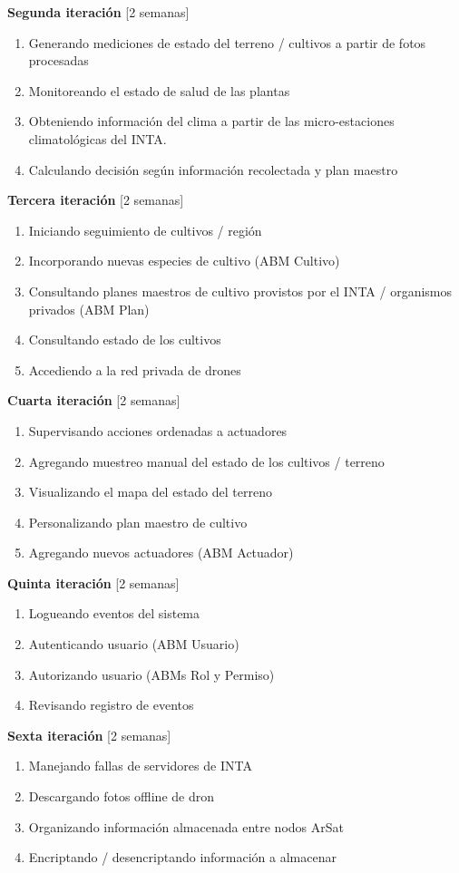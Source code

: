 \textbf{Segunda iteración} [2 semanas]
	\begin{enumerate}
		\item Generando mediciones de estado del terreno / cultivos a partir de fotos procesadas
		\item Monitoreando el estado de salud de las plantas
		\item Obteniendo información del clima a partir de las micro-estaciones climatológicas del INTA.
		\item Calculando decisión según información recolectada y plan maestro
	\end{enumerate}

\textbf{Tercera iteración} [2 semanas]
	\begin{enumerate}
		\item Iniciando seguimiento de cultivos / región
		\item Incorporando nuevas especies de cultivo (ABM Cultivo)
		\item Consultando planes maestros de cultivo provistos por el INTA / organismos privados (ABM Plan)
		\item Consultando estado de los cultivos
		\item Accediendo a la red privada de drones
	\end{enumerate}

\textbf{Cuarta iteración} [2 semanas]
	\begin{enumerate}
		\item Supervisando acciones ordenadas a actuadores
		\item Agregando muestreo manual del estado de los cultivos / terreno
		\item Visualizando el mapa del estado del terreno
		\item Personalizando plan maestro de cultivo
		\item Agregando nuevos actuadores (ABM Actuador)
	\end{enumerate}

\textbf{Quinta iteración} [2 semanas]
	\begin{enumerate}
		\item Logueando eventos del sistema
		\item Autenticando usuario (ABM Usuario)
		\item Autorizando usuario (ABMs Rol y Permiso)
		\item Revisando registro de eventos
	\end{enumerate}

\textbf{Sexta iteración} [2 semanas]
	\begin{enumerate}
		\item Manejando fallas de servidores de INTA
		\item Descargando fotos offline de dron
		\item Organizando información almacenada entre nodos ArSat
		\item Encriptando / desencriptando información a almacenar
	\end{enumerate}

